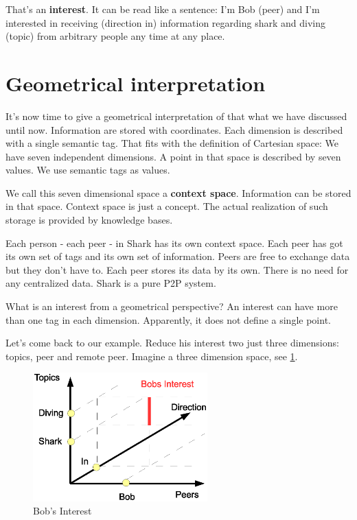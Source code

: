 That's an {\bf interest}. It can be read like a sentence: I'm Bob (peer) and I'm interested in receiving (direction in) information regarding shark and diving (topic) from arbitrary people any time at any place.

\section{Geometrical interpretation}
It's now time to give a geometrical interpretation of that what we have discussed until now. Information are stored with coordinates. Each dimension is described with a single semantic tag. That fits with the definition of Cartesian space: We have seven independent dimensions. A point in that space is described by seven values. We use semantic tags as values.

We call this seven dimensional space a {\bf context space}. Information can be stored in that space. Context space is just a concept. The actual realization of such storage is provided by knowledge bases.

Each person - each peer - in Shark has its own context space. Each peer has got its own set of tags and its own set of information. Peers are free to exchange data but they don't have to. Each peer stores its data by its own. There is no need for any centralized data. Shark is a pure P2P system.

What is an interest from a geometrical perspective? An interest can have more than one tag in each dimension. Apparently, it does not define a single point. 

Let's come back to our example. Reduce his interest two just three dimensions: topics, peer and remote peer. Imagine a three dimension space, 
see \ref{fig:contextspace}. 

\begin{figure}[t]
\centering
\includegraphics[width=0.60\textwidth]{bobsInterest.eps}
\caption{Bob's Interest}
\label{fig:contextspace}
\end{figure}

